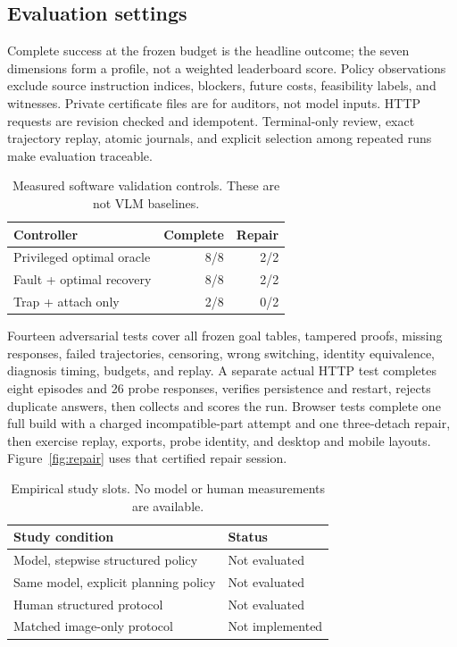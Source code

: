 \documentclass[10pt,twocolumn]{article}
\begin{document}
\subsection{Evaluation settings}
Complete success at the frozen budget is the headline outcome; the seven
dimensions form a profile, not a weighted leaderboard score. Policy observations
exclude source instruction indices, blockers, future costs, feasibility labels,
and witnesses. Private certificate files are for auditors, not model inputs.
HTTP requests are revision checked and idempotent. Terminal-only review, exact
trajectory replay, atomic journals, and explicit selection among repeated runs
make evaluation traceable.

\begin{table}[t]
\centering\small
\caption{Measured software validation controls. These are not VLM baselines.}
\begin{tabular}{lrr}
\toprule
Controller & Complete & Repair\\
\midrule
Privileged optimal oracle & 8/8 & 2/2\\
Fault + optimal recovery & 8/8 & 2/2\\
Trap + attach only & 2/8 & 0/2\\
\bottomrule
\end{tabular}
\label{tab:controls}
\end{table}

Fourteen adversarial tests cover all frozen goal tables, tampered proofs, missing
responses, failed trajectories, censoring, wrong switching, identity equivalence,
diagnosis timing, budgets, and replay. A separate actual HTTP test completes
eight episodes and 26 probe responses, verifies persistence and restart,
rejects duplicate answers, then collects and scores the run. Browser tests
complete one full build with a charged incompatible-part attempt and one
three-detach repair, then exercise replay, exports, probe identity, and desktop
and mobile layouts. Figure~\ref{fig:repair} uses that certified repair session.

\begin{table}[t]
\centering\small
\caption{Empirical study slots. No model or human measurements are available.}
\begin{tabular}{ll}
\toprule
Study condition & Status\\
\midrule
Model, stepwise structured policy & Not evaluated\\
Same model, explicit planning policy & Not evaluated\\
Human structured protocol & Not evaluated\\
Matched image-only protocol & Not implemented\\
\bottomrule
\end{tabular}
\end{table}
\end{document}
